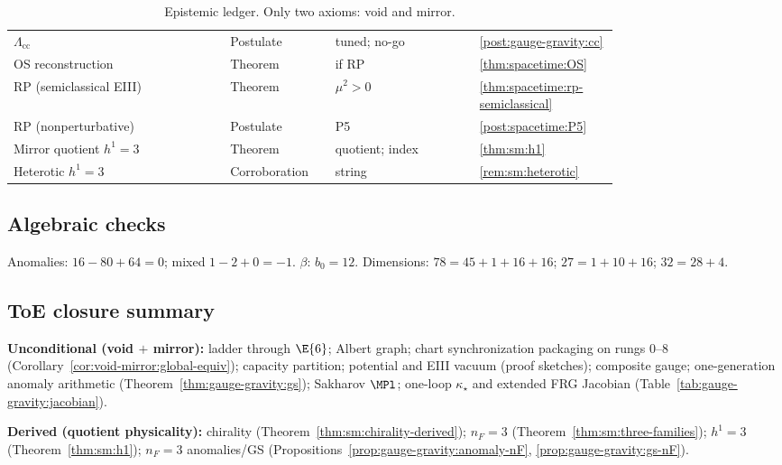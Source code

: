 \begin{table}[ht]
\begin{tabular}{@{}p{0.30\linewidth}p{0.12\linewidth}p{0.20\linewidth}p{0.16\linewidth}@{}}
$\Lambda_{\mathrm{cc}}$ & Postulate & tuned; no-go & \ref{post:gauge-gravity:cc} \\
OS reconstruction & Theorem & if RP & \ref{thm:spacetime:OS} \\
RP (semiclassical EIII) & Theorem & $\mu^2>0$ & \ref{thm:spacetime:rp-semiclassical} \\
RP (nonperturbative) & Postulate & P5 & \ref{post:spacetime:P5} \\
Mirror quotient $h^1=3$ & Theorem & quotient; index & \ref{thm:sm:h1} \\
Heterotic $h^1=3$ & Corroboration & string & \ref{rem:sm:heterotic} \\
\bottomrule
\end{tabular}
\caption{Epistemic ledger. Only two axioms: void and mirror.}
\label{tab:verification:ledger}
\end{table}

\subsection{Algebraic checks}
\label{sec:verification:algebra}

Anomalies: $16-80+64=0$; mixed $1-2+0=-1$. $\beta$: $b_0=12$.
Dimensions: $78=45+1+16+16$; $27=1+10+16$; $32=28+4$.

\subsection{ToE closure summary}
\label{sec:verification:toe}

\textbf{Unconditional (void $+$ mirror):} ladder through $\E{6}$; Albert
graph; chart synchronization packaging on rungs $0$--$8$
(Corollary~\ref{cor:void-mirror:global-equiv}); capacity partition;
potential and EIII vacuum (proof sketches); composite gauge; one-generation
anomaly arithmetic (Theorem~\ref{thm:gauge-gravity:gs}); Sakharov $\MPl$;
one-loop $\kappa_\star$ and extended FRG Jacobian
(Table~\ref{tab:gauge-gravity:jacobian}).

\textbf{Derived (quotient physicality):} chirality
(Theorem~\ref{thm:sm:chirality-derived}); $n_F=3$
(Theorem~\ref{thm:sm:three-families}); $h^1=3$
(Theorem~\ref{thm:sm:h1}); $n_F=3$ anomalies/GS
(Propositions~\ref{prop:gauge-gravity:anomaly-nF}, \ref{prop:gauge-gravity:gs-nF}).


